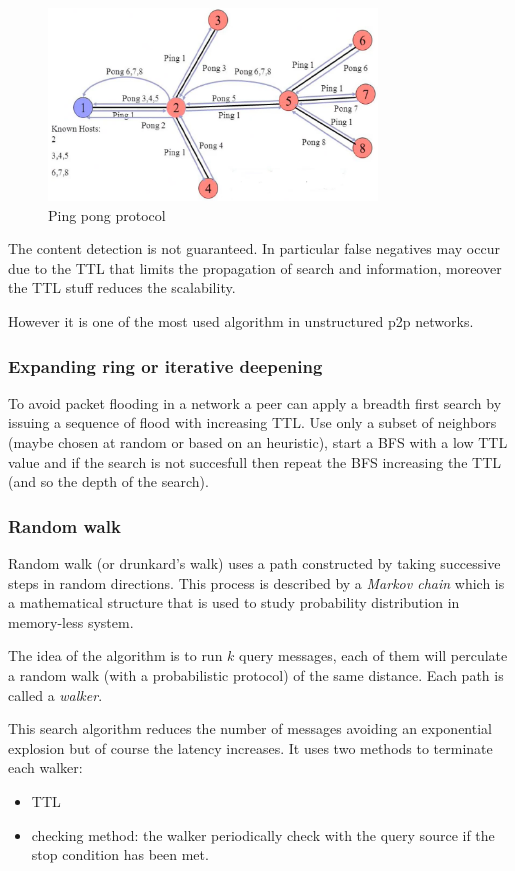 \begin{figure}[H]
    \centering
    \includegraphics[width=330px]{images/2_p2p_networks/02.png}
    \caption{Ping pong protocol}
\end{figure}

The content detection is not guaranteed.
In particular false negatives may occur due to the TTL that limits the propagation of search and information, moreover the TTL stuff reduces the scalability.

However it is one of the most used algorithm in unstructured p2p networks.

\subsubsection{Expanding ring or iterative deepening}
To avoid packet flooding in a network a peer can apply a breadth first search by issuing a sequence of flood with increasing TTL.
Use only a subset of neighbors (maybe chosen at random or based on an heuristic), start a BFS with a low TTL value and if the search is not succesfull then repeat the BFS increasing the TTL (and so the depth of the search).

\subsubsection{Random walk}
Random walk (or drunkard's walk) uses a path constructed by taking successive steps in random directions.
This process is described by a \emph{Markov chain} which is a mathematical structure that is used to study probability distribution in memory-less system.

The idea of the algorithm is to run $k$ query messages, each of them will perculate a random walk (with a probabilistic protocol) of the same distance.
Each path is called a \emph{walker}.

This search algorithm reduces the number of messages avoiding an exponential explosion but of course the latency increases.
It uses two methods to terminate each walker:
\begin{itemize}
    \item TTL
    \item checking method: the walker periodically check with the query source if the stop condition has been met.
\end{itemize}

